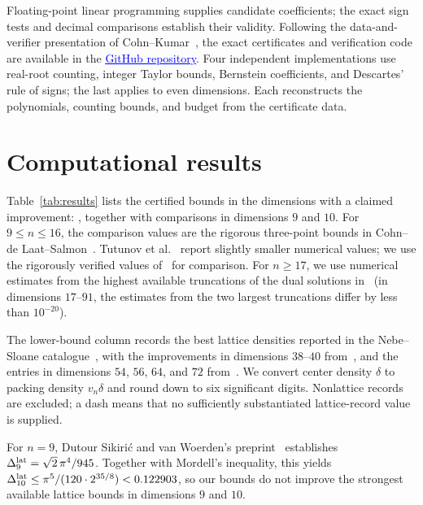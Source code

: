 \documentclass[11pt]{article}
\begin{document}
Floating-point linear programming supplies candidate coefficients;
the exact sign tests and decimal comparisons establish their validity.
Following the data-and-verifier presentation of Cohn--Kumar~\cite{CK},
the exact certificates and verification code are available in the
\href{https://github.com/AstroNinja389/lattice-packing-bound}{\textcolor{blue}{\underline{GitHub repository}}}.
Four independent implementations use real-root counting, integer Taylor
bounds, Bernstein coefficients, and Descartes' rule of signs; the last
applies to even dimensions. Each reconstructs the polynomials, counting
bounds, and budget from the certificate data.

\clearpage
\section{Computational results}\label{sec:results}
Table~\ref{tab:results} lists the certified bounds in the
\ImprovementCount{} dimensions with a claimed improvement:
\ImprovementDimensions, together with comparisons in dimensions $9$ and $10$.
For $9\le n\le16$, the comparison values are the rigorous three-point bounds in
Cohn--de Laat--Salmon~\cite[Table~1.1]{CDS}. Tutunov et al.~\cite[Table~1]{Tutunov}
report slightly smaller numerical values; we use the rigorously verified
values of~\cite{CDS} for comparison.
For $n\ge17$, we use numerical estimates from the highest available
truncations of the dual solutions in~\cite{AJ} (in dimensions $17$--$91$,
the estimates from the two largest truncations differ by less than
$10^{-20}$).

The lower-bound column records the best lattice densities reported in the
Nebe--Sloane catalogue~\cite{NSCatalogue}, with the improvements in dimensions
$38$--$40$ from~\cite{DSW}, and the entries in dimensions $54$, $56$, $64$,
and $72$ from~\cite{Leterrier,CohnTable}.
We convert center density $\delta$ to packing density $v_n\delta$ and round
down to six significant digits. Nonlattice records are excluded; a dash
means that no sufficiently substantiated lattice-record value is supplied.



For $n = 9$, Dutour Sikiri\'c and
van Woerden's preprint~\cite[Corollary~1]{DutourVanWoerden} establishes
$\Delta_9^{\rm lat}=\sqrt2\,\pi^4/945$. Together with Mordell's inequality,
this yields
$\Delta_{10}^{\rm lat}\le\pi^5/(120\cdot2^{35/8})<0.122903$, so our bounds do not improve the strongest available lattice bounds in dimensions $9$ and $10$.
\end{document}
